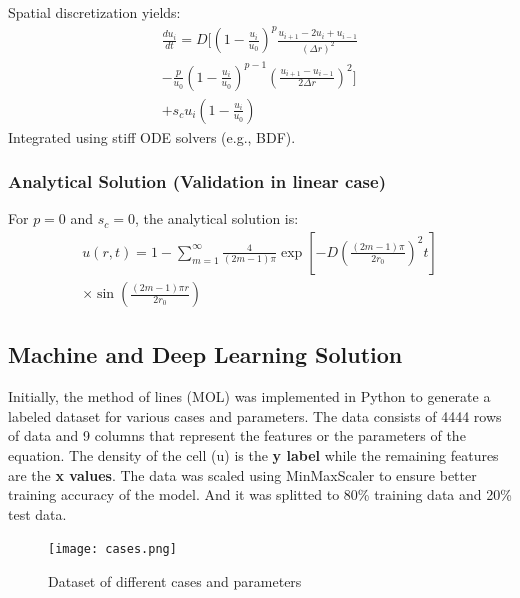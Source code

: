 \documentclass[conference]{IEEEtran}
\begin{document}
Spatial discretization yields:
\begin{multline}
\frac{du_i}{dt} = D \bigg[
\left(1 - \frac{u_i}{u_0}\right)^p 
\frac{u_{i+1} - 2u_i + u_{i-1}}{(\Delta r)^2} \\
- \frac{p}{u_0}
\left(1 - \frac{u_i}{u_0}\right)^{p-1}
\left( \frac{u_{i+1} - u_{i-1}}{2 \Delta r} \right)^2 
\bigg] \\
+ s_c u_i \left(1 - \frac{u_i}{u_0}\right)
\end{multline}
Integrated using stiff ODE solvers (e.g., BDF).

\subsubsection{\textbf{Analytical Solution (Validation in linear case)}}

For \( p = 0 \) and \( s_c = 0 \), the analytical solution is:
\begin{multline}
u(r, t) = 1 - \sum_{m=1}^{\infty} \frac{4}{(2m - 1)\pi}
\exp\left[
    -D \left( \frac{(2m - 1)\pi}{2r_0} \right)^2 t
\right] \\
\times \sin\left( \frac{(2m - 1)\pi r}{2r_0} \right)
\end{multline}

\subsection{\textbf{Machine and Deep Learning Solution}}
Initially, the method of lines (MOL) was implemented in Python to generate a labeled dataset for various cases and parameters. The data consists of 4444 rows of data and 9 columns that represent the features or the parameters of the equation. 
The density of the cell (u) is the \textbf{y label} while the remaining features are the \textbf{x values}. The data was scaled using MinMaxScaler to ensure better training accuracy of the model. And it was splitted to 80\% training data and 20\% test data. 
\begin{figure}[h!]
    \centering
    \texttt{[image: cases.png]}
    \caption{Dataset of different cases and parameters}
    \label{fig:enter-label}
\end{figure}
\end{document}

